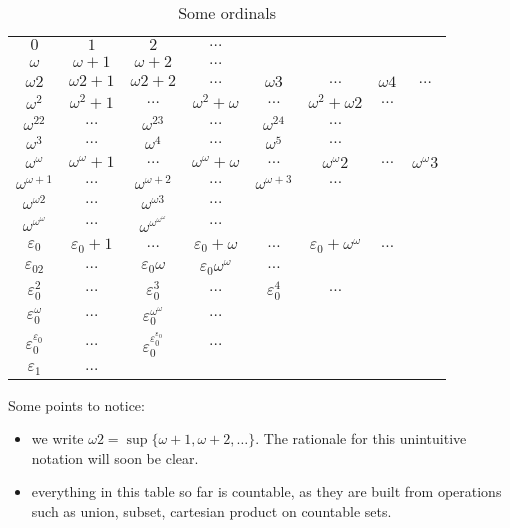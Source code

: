 \documentclass[a4paper]{article}
\begin{document}
{%
  \renewcommand{\arraystretch}{2.5}
\begin{table}[h!]
  \centering
  \begin{tabular}{cccccccc}
    \(0\) & \(1\) & \(2\) & \(\dots\) \\
    \(\omega\) & \(\omega + 1\) & \(\omega + 2\) & \(\dots\) \\
    \(\omega 2\) & \(\omega2 + 1\) & \(\omega2 + 2\) & \(\dots\) & \(\omega3\) & \(\dots\) & \(\omega4\) & \(\dots\) \\
    \(\omega^2\) & \(\omega^2 + 1\) & \(\dots\) & \(\omega^2 + \omega\) & \(\dots\) & \(\omega^2 + \omega2\) & \(\dots\) \\
    \(\omega^22\) & \(\dots\) & \(\omega^23\) & \(\dots\) & \(\omega^24\) & \(\dots\) \\
    \(\omega^3\) & \(\dots\) & \(\omega^4\) & \(\dots\) & \(\omega^5\) & \(\dots\) \\
    \(\omega^\omega\) & \(\omega^\omega + 1\) & \(\dots\) & \(\omega^\omega + \omega\) & \(\dots\) & \(\omega^\omega2\) & \(\dots\) & \(\omega^\omega3\) \\
    \(\omega^{\omega + 1}\) & \(\dots\) & \(\omega^{\omega + 2}\) & \(\dots\) & \(\omega^{\omega + 3}\) & \(\dots\) \\
    \(\omega^{\omega2}\) & \(\dots\) & \(\omega^{\omega 3}\) & \(\dots\) \\
    \(\omega^{\omega^\omega}\) & \(\dots\) & \(\omega^{\omega^{\omega^\omega}}\) & \(\dots\) \\
    \(\varepsilon_0\) & \(\varepsilon_0 + 1\) & \(\dots\) & \(\varepsilon_0 + \omega\) & \(\dots\) & \(\varepsilon_0 + \omega^\omega\) & \(\dots\) \\
    \(\varepsilon_02\) & \(\dots\) & \(\varepsilon_0\omega\) & \(\varepsilon_0\omega^\omega\) & \(\dots\) \\
    \(\varepsilon_0^2\) & \(\dots\) & \(\varepsilon_0^3\) & \(\dots\) & \(\varepsilon_0^4\) & \(\dots\) \\
    \(\varepsilon_0^\omega\) & \(\dots\) & \(\varepsilon_0^{\omega^\omega}\) & \(\dots\) \\
    \(\varepsilon_0^{\varepsilon_0}\) & \(\dots\) & \(\varepsilon_0^{\varepsilon_0^{\varepsilon_0}}\) & \(\dots\) \\
    \(\varepsilon_1\) & \(\dots\)
  \end{tabular}
  \caption{Some ordinals}
  \label{tab:ordinals}
\end{table}
}


Some points to notice:
\begin{itemize}
\item we write \(\omega2 = \sup\{\omega + 1, \omega + 2, \dots\}\). The rationale for this unintuitive notation will soon be clear.
\item everything in this table so far is countable, as they are built from operations such as union, subset, cartesian product on countable sets.
\end{itemize}
\end{document}

